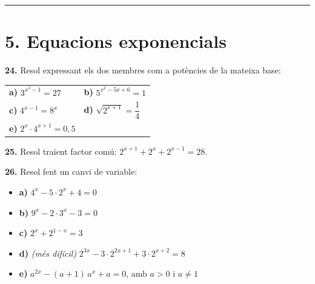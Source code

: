 \documentclass[13pt,a4paper]{extarticle}
\begin{document}
\vspace{1mm}\hrule\vspace{3mm}

\section*{5. Equacions exponencials}

\par\noindent\begin{minipage}{\linewidth}
\textbf{24.} Resol expressant els dos membres com a potències de la mateixa base:\par


\begin{tabular}{@{}p{.46\linewidth}p{.46\linewidth}@{}}
\textbf{a)} $3^{x^2-1}=27$ & \textbf{b)} $5^{x^2-5x+6}=1$ \\[3pt]
\textbf{c)} $4^{x-1}=8^{x}$ & \textbf{d)} $\sqrt{2^{x+1}}=\dfrac{1}{4}$ \\[9pt]
\textbf{e)} $2^{x}\cdot 4^{x+1}=0{,}5$ &  \\[3pt]
\end{tabular}\par
\end{minipage}\par\vspace{1.6mm}
\par\noindent\begin{minipage}{\linewidth}
\textbf{25.} Resol traient factor comú: $2^{x+1}+2^{x}+2^{x-1}=28$.\par
\end{minipage}\par\vspace{1.6mm}
\par\noindent\begin{minipage}{\linewidth}
\textbf{26.} Resol fent un canvi de variable:\par

\begin{itemize}[leftmargin=0pt,itemsep=6pt,topsep=4pt,parsep=0pt,label={}]
\item \textbf{a)} $4^{x}-5\cdot 2^{x}+4=0$
\item \textbf{b)} $9^{x}-2\cdot 3^{x}-3=0$
\item \textbf{c)} $2^{x}+2^{1-x}=3$
\item \textbf{d)} \emph{(més difícil)} $2^{3x}-3\cdot 2^{2x+1}+3\cdot 2^{x+2}=8$
\item \textbf{e)} $a^{2x}-(a+1)\,a^{x}+a=0$, amb $a>0$ i $a\neq1$
\end{itemize}
\end{minipage}\par\vspace{1.6mm}
\end{document}
